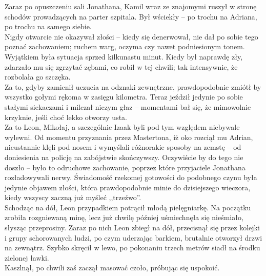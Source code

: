 \documentclass[../MAIN.tex]{subfiles}
\begin{document}
Zaraz po opuszczeniu sali Jonathana, Kamil wraz ze znajomymi ruszył w stronę schodów prowadzących na parter szpitala. Był wściekły -- po trochu na Adriana, po trochu na samego siebie.\\
Nigdy otwarcie nie okazywał złości -- kiedy się denerwował, nie dał po sobie tego poznać zachowaniem; ruchem warg, oczyma czy nawet podniesionym tonem. Wyjątkiem była sytuacja sprzed kilkunastu minut. Kiedy był naprawdę zły, zdarzało mu się zgrzytać zębami, co robił w tej chwili; tak intensywnie, że rozbolała go szczęka.\\
Za to, gdyby zamienił uczucia na odznaki zewnętrzne, prawdopodobnie zmiótł by wszystko gołymi rękoma w zasięgu kilometra. Teraz jeździł jedynie po sobie stałymi siekaczami i milczał niczym głaz -- momentami bał się, że mimowolnie krzyknie, jeśli choć lekko otworzy usta.\\
Za to Leon, Mikołaj, a szczególnie Izaak byli pod tym względem niebywale wylewni. Od momentu przyznania przez Mastertona, iż oko rozciął mu Adrian, nieustannie klęli pod nosem i wymyślali różnorakie sposoby na zemstę -- od doniesienia na policję na zabójstwie skończywszy. Oczywiście by do tego nie doszło -- było to odruchowe zachowanie, poprzez które przyjaciele Jonathana rozładowywali nerwy. Świadomość rzekomej gotowości do podobnego czynu była jedynie objawem złości, która prawdopodobnie minie do dzisiejszego wieczora, kiedy wszyscy zaczną już myśleć ,,trzeźwo''.\\
Schodząc na dół, Leon przypadkiem potrącił młodą pielęgniarkę. Na początku zrobiła rozgniewaną minę, lecz już chwilę później uśmiechnęła się nieśmiało, słysząc przeprosiny. Zaraz po nich Leon zbiegł na dół, przecisnął się przez kolejki i grupy schorowanych ludzi, po czym uderzając barkiem, brutalnie otworzył drzwi na zewnątrz. Szybko skręcił w lewo, po pokonaniu trzech metrów siadł na środku zielonej ławki.\\
Kaszlnął, po chwili zaś zaczął masować czoło, próbując się uspokoić.
\end{document}
